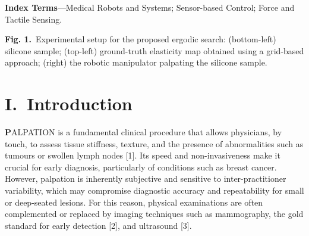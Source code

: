 \documentclass[11pt]{article}
\begin{document}
\vspace{0.6em}

\noindent\textbf{Index Terms}---Medical Robots and Systems;
Sensor-based Control; Force and Tactile Sensing.

\vspace{0.8em}

\begin{center}
\end{center}

\vspace{0.4em}

\textbf{Fig. 1.}\ Experimental setup for the proposed ergodic search:
(bottom-left) silicone sample; (top-left) ground-truth elasticity map
obtained using a grid-based approach; (right) the robotic manipulator
palpating the silicone sample.

\vspace{1em}

\section*{I.\ Introduction}

\textbf{P}ALPATION is a fundamental clinical procedure that allows
physicians, by touch, to assess tissue stiffness, texture, and the
presence of abnormalities such as tumours or swollen lymph nodes [1].
Its speed and non-invasiveness make it crucial for early diagnosis,
particularly of conditions such as breast cancer. However, palpation
is inherently subjective and sensitive to inter-practitioner
variability, which may compromise diagnostic accuracy and
repeatability for small or deep-seated lesions. For this reason,
physical examinations are often complemented or replaced by imaging
techniques such as mammography, the gold standard for early detection
[2], and ultrasound [3].
\end{document}
